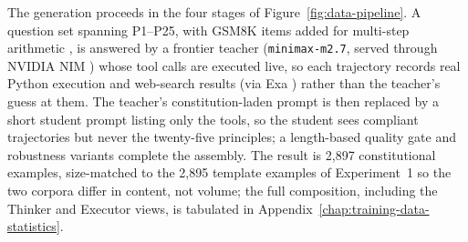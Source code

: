 The generation proceeds in the four stages of Figure~\ref{fig:data-pipeline}. A question set spanning P1--P25, with GSM8K items added for multi-step arithmetic \cite{cobbe2021trainingverifierssolvemath}, is answered by a frontier teacher (\texttt{minimax-m2.7}, served through NVIDIA NIM \cite{nvidianim}) whose tool calls are executed live, so each trajectory records real Python execution and web-search results (via Exa \cite{exaai}) rather than the teacher's guess at them. The teacher's constitution-laden prompt is then replaced by a short student prompt listing only the tools, so the student sees compliant trajectories but never the twenty-five principles; a length-based quality gate and robustness variants complete the assembly. The result is 2,897 constitutional examples, size-matched to the 2,895 template examples of Experiment~1 so the two corpora differ in content, not volume; the full composition, including the Thinker and Executor views, is tabulated in Appendix~\ref{chap:training-data-statistics}.

